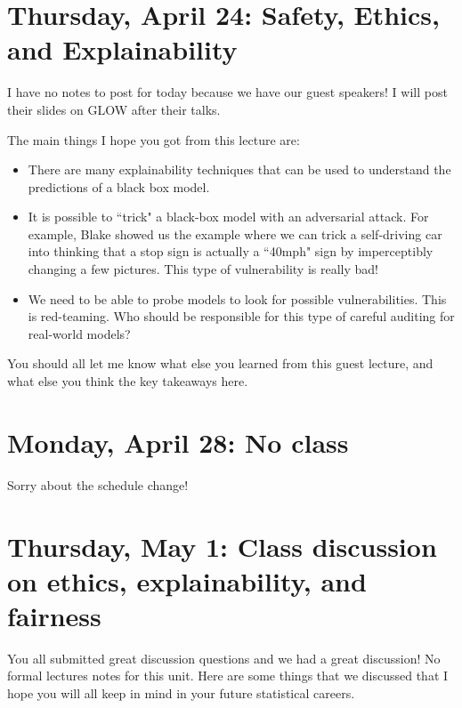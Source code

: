 \section{Thursday, April 24: Safety, Ethics, and Explainability}

I have no notes to post for today because we have our guest speakers! I will post their slides on GLOW after their talks. 

The main things I hope you got from this lecture are:

\begin{itemize}
\item There are many explainability techniques that can be used to understand the predictions of a black box model. 
\item It is possible to ``trick" a black-box model with an adversarial attack. For example, Blake showed us the example where we can trick a self-driving car into thinking that a stop sign is actually a ``40mph" sign by imperceptibly changing a few pictures. This type of vulnerability is really bad!
\item We need to be able to probe models to look for possible vulnerabilities. This is red-teaming. Who should be responsible for this type of careful auditing for real-world models? 	
\end{itemize}

You should all let me know what else you learned from this guest lecture, and what else you think the key takeaways here. 


\section{Monday, April 28: No class}

Sorry about the schedule change!

\section{Thursday, May 1: Class discussion on ethics, explainability, and fairness}

You all submitted great discussion questions and we had a great discussion! No formal lectures notes for this unit. Here are some things that we discussed that I hope you will all keep in mind in your future statistical careers.

